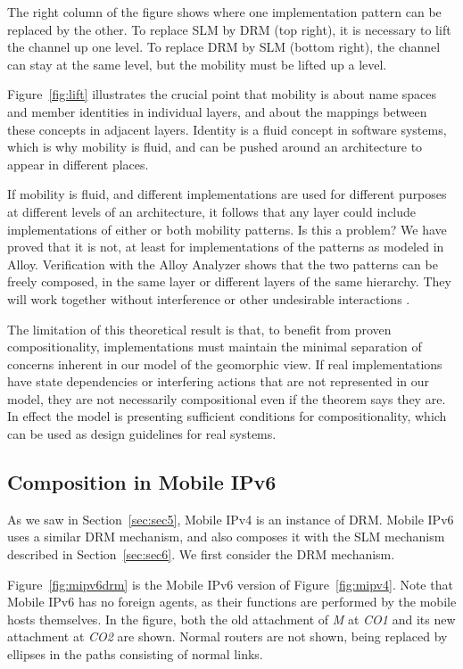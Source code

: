The right column of the figure shows where one implementation pattern
can be replaced by the other.
To replace SLM by DRM (top right), it is necessary to lift the channel
up one level.
To replace DRM by SLM (bottom right), the channel can stay at the same
level, but the mobility must be lifted up a level.

Figure~\ref{fig:lift} illustrates the crucial point that mobility
is about name spaces and member identities in individual layers,
and about the mappings between these concepts in adjacent layers.
Identity is a fluid concept in software systems, which is why mobility
is fluid, and can be pushed around an architecture to appear in
different places.

If mobility is fluid, and different implementations are used for
different purposes at different levels of an architecture,
it follows that any layer could include implementations of either or
both mobility patterns.
Is this a problem?
We have proved that it is not, at least for implementations of the
patterns as modeled in Alloy.
Verification with the Alloy Analyzer shows that the two patterns
can be freely composed, in the same layer or
different layers of the same hierarchy.
They will work together without interference or other
undesirable interactions \cite{cnm}.

The limitation of this theoretical result is that,
to benefit from proven
compositionality,
implementations must maintain the minimal separation of concerns
inherent in our model of the geomorphic view.
If real implementations have state dependencies or interfering actions
that are not represented in our model, they are not necessarily
compositional even if the theorem says they are.
In effect the model is presenting sufficient
conditions for compositionality, which can be used as design guidelines
for real systems.

\subsection{Composition in Mobile IPv6}
\label{sec:mipv6}

As we saw in Section~\ref{sec:sec5}, Mobile IPv4 is an instance of DRM.
Mobile IPv6 \cite{mipv6old,mipv6new} uses a similar DRM mechanism, and
also composes it with the SLM mechanism described in 
Section~\ref{sec:sec6}.
We first consider the DRM mechanism.

Figure~\ref{fig:mipv6drm} is the Mobile IPv6 version of 
Figure~\ref{fig:mipv4}.
Note that Mobile IPv6 has no foreign agents, as their functions are
performed by the mobile hosts themselves.
In the figure, both the old attachment of {\it M} at {\it CO1}
and its new attachment at {\it CO2} are shown.
Normal routers are not shown, being replaced by ellipses in the
paths consisting of normal links.

